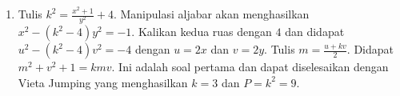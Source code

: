 \documentclass[11pt]{scrartcl}
\begin{document}
\begin{enumerate}
    \begin{align*}
        k &= \dfrac{(X + Y + Z)^2}{XYZ}\\
        &= \dfrac{(X+Y + Z)}{XZ} \cdot \dfrac{(X + Y + Z)}{Y}\\
        &\leq \dfrac{(X+ X + X)}{XZ} \cdot \dfrac{(Y + Z) + Y + Z}{Y}\\
        &\leq \dfrac{3}{Z} \cdot \dfrac{4Y}{Y}\\
        &= \dfrac{12}{Z}
    \end{align*}
    Dikarenakan $Z$ adalah bilangan asli maka $k \leq 12$. Jika $Z = 1$ maka $X \leq Y + Z = Y + 1$ membuat $X = Y$ atau $X = Y + 1$. Substitusikan nilai ini ke persamaan awal dan akan didapat nilai $k = 5, 6, 8$ dan $9$. 

    Jika $Z > 1$ maka $k < 6$. Hanya perlu dicek apakah $k = 1, 2, 3, 4$ memenuhi. Dapat dicek manual bahwa $(9, 9, 9), (8, 4, 4), (3, 3, 3), (4, 2, 2)$ secara berturut-turut memberikan solusi $k = 1, 2, 3, 4$. Jadi, $k = 1, 2, 3, 4, 5, 6, 8, 9$.
    \item Tulis $k^2 = \frac{x^2 + 1}{y^2} + 4$. Manipulasi aljabar akan menghasilkan $x^2 - (k^2 - 4)y^2 = -1$. Kalikan kedua ruas dengan $4$ dan didapat $u^2 - (k^2 - 4)v^2 = -4$ dengan $u = 2x$ dan $v = 2y$. Tulis $m = \frac{u + kv}{2}$. Didapat $m^2 + v^2 + 1 = kmv$. Ini adalah soal pertama dan dapat diselesaikan dengan Vieta Jumping yang menghasilkan $k = 3$ dan $P = k^2 = 9$.
\end{enumerate}
\end{document}
